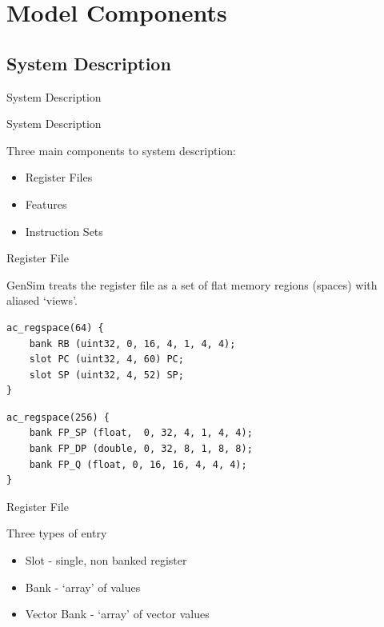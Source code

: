 \section{Model Components}
\subsection{System Description}

\begin{frame}{System Description}
\end{frame}

\begin{frame}{System Description}

Three main components to system description:
\begin{itemize}
\item Register Files
\item Features
\item Instruction Sets
\end{itemize}

\end{frame}

\begin{frame}{Register File}

GenSim treats the register file as a set of flat memory regions (spaces)
with aliased `views'.

\end{frame}

\newsavebox{\codeboxone}
\begin{lrbox}{\codeboxone}
\begin{lstlisting}
ac_regspace(64) {
	bank RB (uint32, 0, 16, 4, 1, 4, 4);
	slot PC (uint32, 4, 60) PC;
	slot SP (uint32, 4, 52) SP;
}
\end{lstlisting}
\end{lrbox}

\newsavebox{\codeboxtwo}
\begin{lrbox}{\codeboxtwo}
\begin{lstlisting}
ac_regspace(256) {
	bank FP_SP (float,  0, 32, 4, 1, 4, 4);
	bank FP_DP (double, 0, 32, 8, 1, 8, 8);
	bank FP_Q (float, 0, 16, 16, 4, 4, 4);
}
\end{lstlisting}
\end{lrbox}

\begin{frame}{Register File}

Three types of entry
\begin{itemize}
\item Slot - single, non banked register
\item Bank - `array' of values
\item Vector Bank - `array' of vector values
\end{itemize}

\end{frame}

